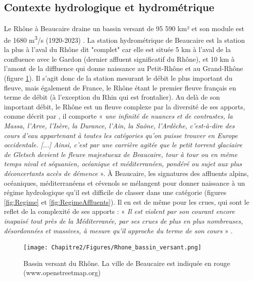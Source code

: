 	\subsection{Contexte hydrologique et hydrométrique}
	
	\paragraph{} Le Rhône à Beaucaire draine un bassin versant de 95 590 km² et son module est de 1680 m\textsuperscript{3}/s (1920-2023) \citep{medd_banque_2021}. La station hydrométrique de Beaucaire est la station la plus à l'aval du Rhône dit "complet" car elle est située 5 km à l'aval de la confluence avec le Gardon (dernier affluent significatif du Rhône), et 10 km à l'amont de la diffluence qui donne naissance au Petit-Rhône et au Grand-Rhône (figure \ref{fig:BV}). Il s'agit donc de la station mesurant le débit le plus important du fleuve, mais également de France, le Rhône étant le premier fleuve français en terme de débit (à l'exception du Rhin qui est frontalier). Au delà de son important débit, le Rhône est un fleuve complexe par la diversité de ses apports, comme décrit par \citet{parde_regime_1925}, il comporte « \textit{ une infinité de nuances et de contrastes, la Massa, l'Arve, l'Isère, la Durance, l'Ain, la Saône, l'Ardèche, c'est-à-dire des cours d'eau appartenant à toutes les catégories qu'on puisse trouver en Europe occidentale. [...] Ainsi, c'est par une carrière agitée que le petit torrent glaciaire de Gletsch devient le fleuve majestueux de Beaucaire, tour à tour ou en même temps nival et séquanien, océanique et méditerranéen, pondéré ou sujet aux plus déconcertants accès de démence} ». À Beaucaire, les signatures des affluents alpins, océaniques, méditerranéens et cévenols se mélangent pour donner naissance à un régime hydrologique qu'il est difficile de classer dans une catégorie (figures \ref{fig:Regime} et \ref{fig:RegimeAffluents}). Il en est de même pour les crues, qui sont le reflet de la complexité de ses apports : « \textit{Il est violent par son courant encore inapaisé tout près de la Méditerranée, par ses crues de plus en plus nombreuses, désordonnées et massives, à mesure qu'il approche du terme de son cours} » \citep{parde_regime_1925}. 
	
		\begin{figure}[h!]
	\centering
		\texttt{[image: Chapitre2/Figures/Rhone\_bassin\_versant.png]}
        \caption{Bassin versant du Rhône. La ville de Beaucaire est indiquée en rouge (www.openstreetmap.org)}	
		\label{fig:BV}
	\end{figure}
	
